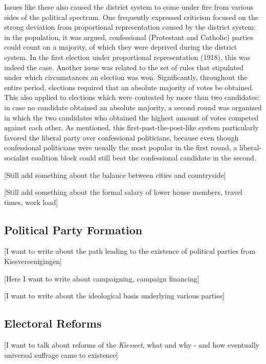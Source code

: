 \documentclass[12pt]{article}
\begin{document}
    Issues like these also caused the district system to come under fire from various sides of the political spectrum. One frequently expressed criticism focused on the strong deviation from proportional representation caused by the district system: in the population, it was argued, confessional (Protestant and Catholic) parties could count on a majority, of which they were deprived during the district system. In the first election under proportional representation (1918), this was indeed the case. Another issue was related to the set of rules that stipulated under which circumstances an election was won. Significantly, throughout the entire period, elections required that an absolute majority of votes be obtained. This also applied to elections which were contested by more than two candidates: in case no candidate obtained an absolute majority, a second round was organized in which the two candidates who obtained the highest amount of votes competed against each other. As mentioned, this first-past-the-post-like system particularly favored the liberal party over confessional politicians, because even though confessional politicians were usually the most popular in the first round, a liberal-socialist coalition block could still beat the confessional candidate in the second. 

    [Still add something about the balance between cities and countryside]
    
    [Still add something about the formal salary of lower house members, travel times, work load]
    
\subsection{Political Party Formation}

[I want to write about the path leading to the existence of political parties from Kiesvereenigingen]

[Here I want to write about campaigning, campaign financing]

[I want to write about the ideological basis underlying various parties]

\subsection{Electoral Reforms}

[I want to talk about reforms of the \textit{Kieswet}, what and why - and how eventually universal suffrage came to existence]
\end{document}
